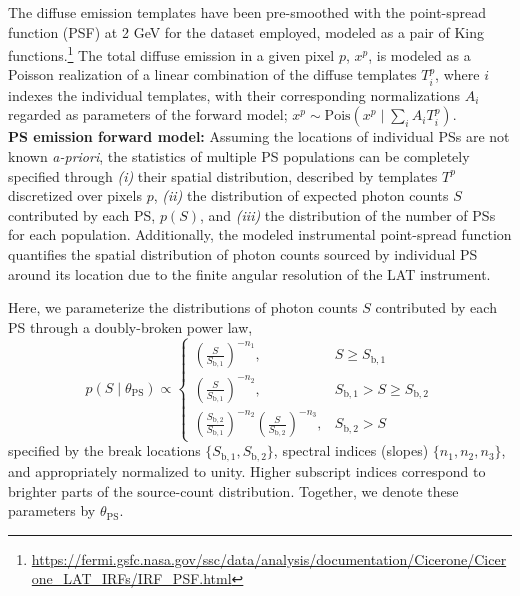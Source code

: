 \documentclass[prd,aps,10pt,nofootinbib,twocolumn,superscriptaddress,preprintnumbers,balancelastpage,longbibliography,floatfix]{revtex4-2}
\begin{document}
The diffuse emission templates have been pre-smoothed with the \Fermi point-spread function (PSF) at 2 GeV for the dataset employed, modeled as a pair of King functions.\footnote{\url{https://fermi.gsfc.nasa.gov/ssc/data/analysis/documentation/Cicerone/Cicerone_LAT_IRFs/IRF_PSF.html}} The total diffuse emission in a given pixel $p$, $x^p$, is modeled as a Poisson realization of a linear combination of the diffuse templates $T^p_i$, where $i$ indexes the individual templates, with their corresponding normalizations $A_i$ regarded as parameters of the forward model; $x^p \sim \mathrm{Pois}\left(x^p\mid\sum_i A_i T^p_i\right)$. \\ 

\noindent
\textbf{PS emission forward model:} Assuming the locations of individual PSs are not known \emph{a-priori}, the statistics of multiple PS populations can be completely specified through \emph{(i)} their spatial distribution, described by templates $T^p$ discretized over pixels $p$, \emph{(ii)} the distribution of expected photon counts $S$ contributed by each PS, $p(S)$, and \emph{(iii)} the distribution of the number of PSs for each population.  Additionally, the modeled instrumental point-spread function quantifies the spatial distribution of photon counts sourced by individual PS around its location due to the finite angular resolution of the LAT instrument.

Here, we parameterize the distributions of photon counts $S$ contributed by each PS through a doubly-broken power law,
\begin{equation}
\label{eq:scd_bpl}
p(S\mid\theta_\mathrm{PS})\propto \left\{\begin{array}{lc}
\left(\frac{S}{S_{\mathrm b, 1}}\right)^{-n_{1}}, & S \geq S_{\mathrm b, 1} \\
\left(\frac{S}{S_{\mathrm b, 1}}\right)^{-n_{2}}, & S_{\mathrm b, 1}>S \geq S_{\mathrm b, 2} \\
\left(\frac{S_{\mathrm b, 2}}{S_{\mathrm b, 1}}\right)^{-n_{2}}\left(\frac{S}{S_{\mathrm b, 2}}\right)^{-n_{3}}, & S_{\mathrm b, 2}>S
\end{array}\right.
\end{equation}
specified by the break locations $\{S_{\mathrm b, 1}, S_{\mathrm b, 2}\}$, spectral indices (slopes) $\{n_1, n_2, n_3\}$, and appropriately normalized to unity. Higher subscript indices correspond to brighter parts of the source-count distribution. Together, we denote these parameters by $\theta_\mathrm{PS}$.
\end{document}
